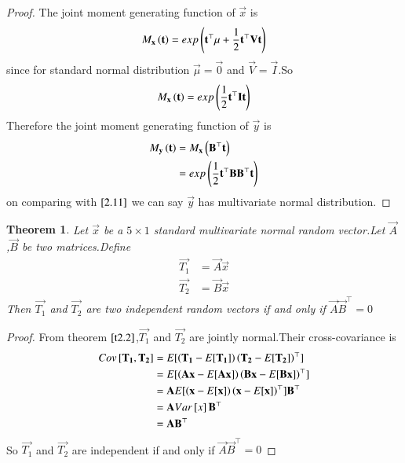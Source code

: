 \documentclass[journal,12pt,twocolumn]{IEEEtran}
\newtheorem{theorem}{Theorem}[section]
\begin{document}
\begin{proof}
The joint moment generating function of $\vec{x}$ is
\begin{align}
    M_{\mathbf{x}}\left(\mathbf{t}\right)=exp\left(\mathbf{t}^{\top}\mu+\frac{1}{2}\mathbf{t}^{\top}\mathbf{V}\mathbf{t}\right)
\end{align}
since for standard normal distribution $\vec{\mu}=\vec{0}$ and $\vec{V}=\vec{I}$.So
\begin{align}
     M_{\mathbf{x}}\left(\mathbf{t}\right)=exp\left(\frac{1}{2}\mathbf{t}^{\top}\mathbf{I}\mathbf{t}\right)\label{2.11}
\end{align}
Therefore the joint moment generating function of $\vec{y}$ is
\begin{align}
    M_{\mathbf{y}}\left(\mathbf{t}\right)&=M_{\mathbf{x}}\left(\mathbf{B}^{\top}\mathbf{t}\right)\\
    &=exp\left(\frac{1}{2}\mathbf{t}^{\top}\mathbf{B}\mathbf{B}^{\top}\mathbf{t}\right)
\end{align}
on comparing with $\eqref{2.11}$ we can say $\vec{y}$ has multivariate normal distribution. 
\end{proof}
\begin{theorem}
\label{t2.3}
Let $\vec{x}$ be a $5\times 1$ standard multivariate normal random vector.Let $\vec{A}$ ,$\vec{B}$ be two matrices.Define
\begin{align}
    \vec{T_1}&=\vec{A}\vec{x}\\
    \vec{T_2}&=\vec{B}\vec{x}
\end{align}
Then $\vec{T_1}$ and $\vec{T_2}$ are two independent random vectors if and only if $\vec{A}\vec{B}^{\top}=0$
\end{theorem}
\begin{proof}
From theorem $\ref{t2.2}$,$\vec{T_1}$ and $\vec{T_2}$ are jointly normal.Their cross-covariance is
\begin{align}
    Cov{}\left[\mathbf{T_1},\mathbf{T_2}\right]&=E[ \left(\mathbf{T_1}-E[ \mathbf{T_1} ]\right)\left(\mathbf{T_2}-E[ \mathbf{T_2} ]\right)^{\top} ]\\
    &=E[ \left(\mathbf{A}\mathbf{x}-E[ \mathbf{A}\mathbf{x} ]\right)\left(\mathbf{B}\mathbf{x}-E[ \mathbf{B}\mathbf{x} ]\right)^{\top} ]\\
    &=\mathbf{A}E[ \left(\mathbf{x}-E[ \mathbf{x} ]\right)\left(\mathbf{x}-E[ \mathbf{x} ]\right)^{\top} ]\mathbf{B}^{\top}\\
    &=\mathbf{A}Var{}\left[x\right]\mathbf{B}^{\top}\\
    &=\mathbf{A}\mathbf{B}^{\top}
\end{align}
So $\vec{T_1}$ and $\vec{T_2}$ are independent if and only if $\vec{A}\vec{B}^{\top}=0$
\end{proof}
\end{document}
